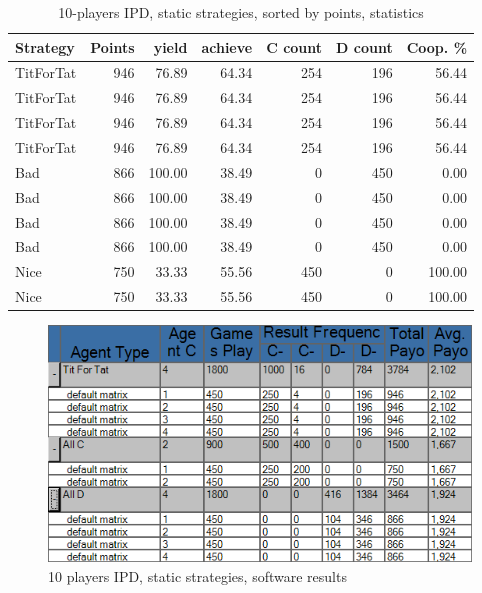 \documentclass[journal,10pt,twoside]{IEEEtran}
\begin{document}
\begin{table}[ht]
    \caption{10-players IPD, static strategies, sorted by points, statistics}
    \label{tab:ipdmp10stat}
    \centering
    \begin{tabular}{l|rrr|rrr} \toprule
        Strategy  & Points &  yield & achieve & C count & D count & Coop. \% \\ \midrule
        TitForTat &    946 &  76.89 &   64.34 &     254 &     196 &    56.44 \\
        TitForTat &    946 &  76.89 &   64.34 &     254 &     196 &    56.44 \\
        TitForTat &    946 &  76.89 &   64.34 &     254 &     196 &    56.44 \\
        TitForTat &    946 &  76.89 &   64.34 &     254 &     196 &    56.44 \\
        Bad       &    866 & 100.00 &   38.49 &       0 &     450 &     0.00 \\
        Bad       &    866 & 100.00 &   38.49 &       0 &     450 &     0.00 \\
        Bad       &    866 & 100.00 &   38.49 &       0 &     450 &     0.00 \\
        Bad       &    866 & 100.00 &   38.49 &       0 &     450 &     0.00 \\
        Nice      &    750 &  33.33 &   55.56 &     450 &       0 &   100.00 \\
        Nice      &    750 &  33.33 &   55.56 &     450 &       0 &   100.00 \\ \bottomrule
    \end{tabular}
\end{table}

\begin{figure}[!ht]
    \centering
    \includegraphics[width=.6\columnwidth]{../img/ipdmp/ipdmp10-table-det}
    \caption{10 players IPD, static strategies, software results \cite{demosw}}
    \label{fig:ipdmp10statsw}
\end{figure}
\end{document}
